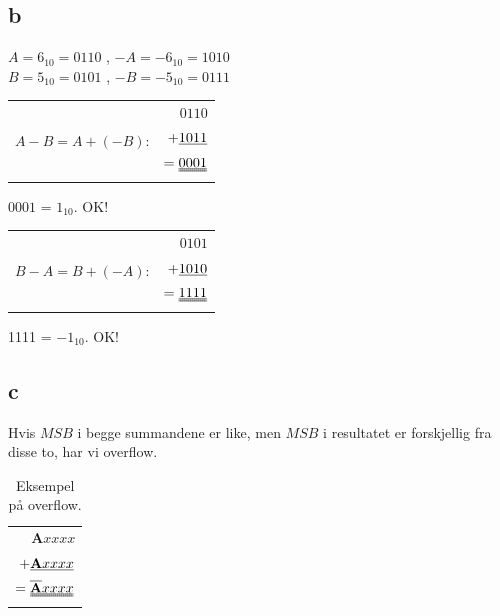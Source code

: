 \documentclass[12pt,norsk,a4paper]{article}
\begin{document}
\clearpage
\subsection{b}
$A = 6_{10} = 0110$ \hspace{0.5cm} , \hspace{0.5cm}  $-A = -6_{10} = 1010$\\
$B = 5_{10} = 0101$ \hspace{0.5cm} , \hspace{0.5cm} $-B = -5_{10} = 0111$\\
\begin{table}[H]
    \begin{tabular}{cr}
    \multirow{3}{*}{$A-B = A+(-B)$: } & $  0110$\\
                                     & $+\uline{1011}$\\
                                     & $=\uuline{0001}$
    \end{tabular}
\end{table}
$0001$ = $1_{10}$. OK!

\begin{table}[H]
    \begin{tabular}{cr}
    \multirow{3}{*}{$B-A = B+(-A)$: } & $  0101$\\
                                     & $+ \uline{1010}$\\
                                     & $= \uuline{1111}$
    \end{tabular}
\end{table}
1111 = $-1_{10}$. OK!

\subsection{c}
Hvis $MSB$ i begge summandene er like, men $MSB$ i resultatet er forskjellig fra disse to, har vi overflow.
\begin{table}[H]
    \begin{center}
    \begin{tabular}{|r|}
    \hline
    $ \textbf{A}xxxx$\\
    $+\uline{\textbf{A}xxxx}$\\
    $=\uuline{\overline{\textbf{A}}xxxx}$\\
    \hline
    \end{tabular}
    \end{center}
    \caption{Eksempel på overflow.}
\end{table}
\end{document}
